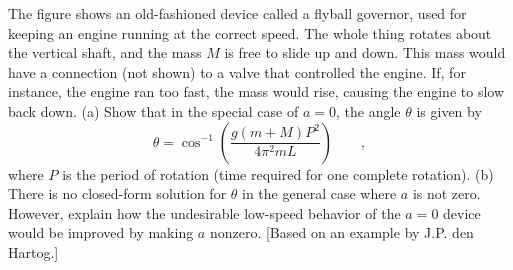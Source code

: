  The figure shows an old-fashioned device called a
flyball governor, used for keeping an engine running at the
correct speed. The whole thing rotates about the vertical
shaft, and the mass $M$ is free to slide up and down. This
mass would have a connection (not shown) to a valve that
controlled the engine. If, for instance, the engine ran too
fast, the mass would rise, causing the engine to slow back down.\hwendpart
(a) Show that in the special case of $a=0$, the angle
$\theta $ is given by
\begin{equation*}
        \theta  =  \cos^{-1}\left(\frac{g(m+M)P^2}{4\pi^2mL}\right)   \qquad   ,
\end{equation*}
where $P$ is the period of rotation (time required for
one complete rotation).\hwendpart
(b) There is no closed-form solution for $\theta $ in the
general case where $a$ is not zero. However, explain how the
undesirable low-speed behavior of the $a=0$ device would be
improved by making $a$ nonzero.\hwendpart
[Based on an example by J.P. den Hartog.]
